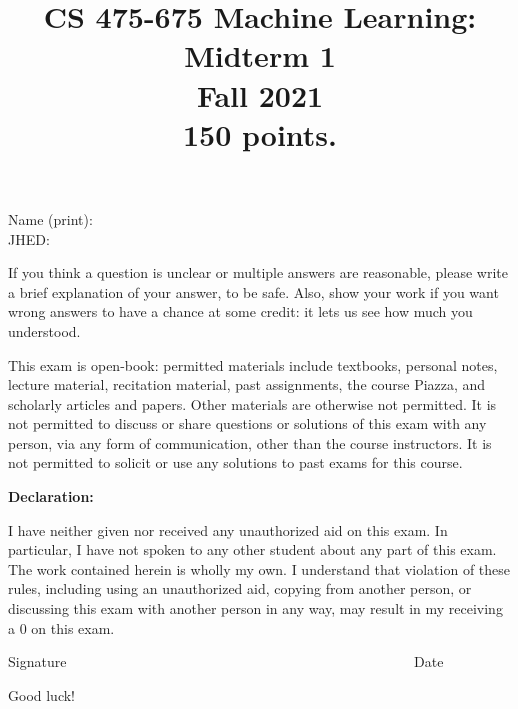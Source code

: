 \documentclass[11pt]{article}
\title{CS 475-675 Machine Learning: Midterm 1\\
\Large{Fall 2021}\\
150 points. }
\author{}
\date{}
\begin{document}
\large
\maketitle
\thispagestyle{headings}

\vspace{-.5in}
\noindent Name (print):
\underline{} \\

\noindent JHED:
\underline{}


 \vspace{3cm}
 If you think a question is unclear or multiple answers are reasonable, please write a brief explanation of your answer,
 to be safe. Also, show your work if you want wrong answers to have a chance at some credit: it lets us see how much you understood.

 This exam is open-book: permitted materials include textbooks, personal notes, lecture material, recitation material, past assignments, the course Piazza, and scholarly articles and papers. Other materials are otherwise not permitted. It is not permitted to discuss or share questions or solutions of this exam with any person, via any form of communication, other than the course instructors.  It is not permitted to solicit or use any solutions to past exams for this course.
 \vspace{1cm}

 \textbf{ Declaration:}

I have neither given nor received any unauthorized aid on this exam. In particular, I have not spoken to any other student about any part of this exam.
The work contained herein is wholly my own.  I understand that violation of these rules, including using an unauthorized aid, copying from another person,
or discussing this exam with another person in any way, may result in my receiving a 0 on this exam.
\begin{center}
\noindent\underline{\makebox[6in][l]{}}

 Signature ~~~~~~~~~~~~~~~~~~~~~~~~~~~~~~~~~~~~~~~~~~~~~~~~~Date


 \vspace{3cm}
 Good luck!
 \end{center}


\newpage

%
%
%
%
\end{document}
